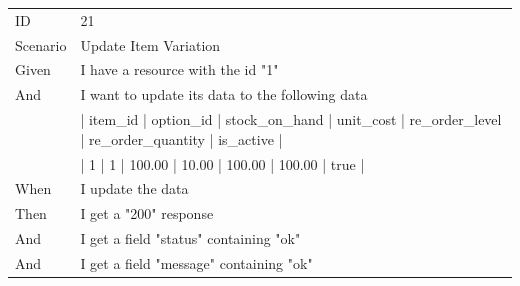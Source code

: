 \documentclass{report}
\begin{document}
\begin{tabular}{ l l }
ID 			& 21 \\
Scenario		& Update Item Variation \\
Given 		& I have a resource with the id "1" \\
And			& I want to update its data to the following data \\
      		& | item\_id | option\_id | stock\_on\_hand | unit\_cost | re\_order\_level | re\_order\_quantity | is\_active | \\
      		& | 1       | 1         | 100.00        | 10.00     | 100.00         | 100.00            | true      | \\
When 		& I update the data \\
Then 		& I get a "200" response \\
And 			& I get a field "status" containing "ok" \\
And 			& I get a field "message" containing "ok" \\
\end{tabular}
\newpage
\end{document}
